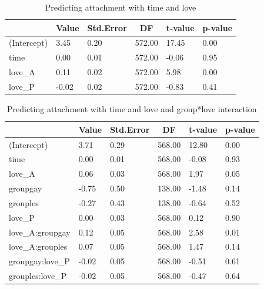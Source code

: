 \documentclass[man]{apa6}
\begin{document}
\begin{table}[tbp]

\begin{center}
\begin{threeparttable}

\caption{\label{tab:unnamed-chunk-16}Predicting attachment with time and love}

\begin{tabular}{llllll}
\toprule
 & \multicolumn{1}{c}{Value} & \multicolumn{1}{c}{Std.Error} & \multicolumn{1}{c}{DF} & \multicolumn{1}{c}{t-value} & \multicolumn{1}{c}{p-value}\\
\midrule
(Intercept) & 3.45 & 0.20 & 572.00 & 17.45 & 0.00\\
time & 0.00 & 0.01 & 572.00 & -0.06 & 0.95\\
love\_A & 0.11 & 0.02 & 572.00 & 5.98 & 0.00\\
love\_P & -0.02 & 0.02 & 572.00 & -0.83 & 0.41\\
\bottomrule
\end{tabular}

\end{threeparttable}
\end{center}

\end{table}

\begin{table}[tbp]

\begin{center}
\begin{threeparttable}

\caption{\label{tab:unnamed-chunk-17}Predicting attachment with time and love and group*love interaction}

\begin{tabular}{llllll}
\toprule
 & \multicolumn{1}{c}{Value} & \multicolumn{1}{c}{Std.Error} & \multicolumn{1}{c}{DF} & \multicolumn{1}{c}{t-value} & \multicolumn{1}{c}{p-value}\\
\midrule
(Intercept) & 3.71 & 0.29 & 568.00 & 12.80 & 0.00\\
time & 0.00 & 0.01 & 568.00 & -0.08 & 0.93\\
love\_A & 0.06 & 0.03 & 568.00 & 1.97 & 0.05\\
groupgay & -0.75 & 0.50 & 138.00 & -1.48 & 0.14\\
grouples & -0.27 & 0.43 & 138.00 & -0.64 & 0.52\\
love\_P & 0.00 & 0.03 & 568.00 & 0.12 & 0.90\\
love\_A:groupgay & 0.12 & 0.05 & 568.00 & 2.58 & 0.01\\
love\_A:grouples & 0.07 & 0.05 & 568.00 & 1.47 & 0.14\\
groupgay:love\_P & -0.02 & 0.05 & 568.00 & -0.51 & 0.61\\
grouples:love\_P & -0.02 & 0.05 & 568.00 & -0.47 & 0.64\\
\bottomrule
\end{tabular}

\end{threeparttable}
\end{center}

\end{table}
\end{document}
